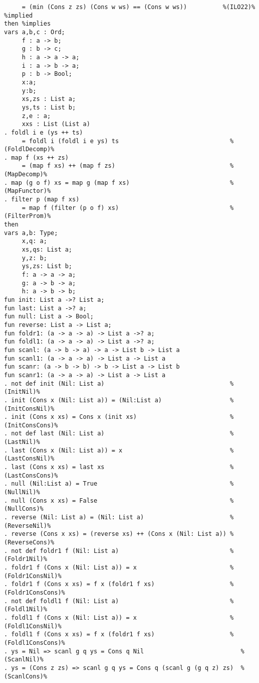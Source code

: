 \begin{Verbatim}
     = (min (Cons z zs) (Cons w ws) == (Cons w ws))          %(ILO22)% %implied
then %implies
vars a,b,c : Ord;
     f : a -> b;
     g : b -> c;
     h : a -> a -> a;
     i : a -> b -> a;
     p : b -> Bool;
     x:a;
     y:b;
     xs,zs : List a;
     ys,ts : List b;
     z,e : a;
     xxs : List (List a)
. foldl i e (ys ++ ts) 
     = foldl i (foldl i e ys) ts                               %(FoldlDecomp)%
. map f (xs ++ zs) 
     = (map f xs) ++ (map f zs)                                %(MapDecomp)%
. map (g o f) xs = map g (map f xs)                            %(MapFunctor)%
. filter p (map f xs) 
     = map f (filter (p o f) xs)                               %(FilterProm)%
then
vars a,b: Type;
     x,q: a;
     xs,qs: List a;
     y,z: b;
     ys,zs: List b;
     f: a -> a -> a;
     g: a -> b -> a;
     h: a -> b -> b;
fun init: List a ->? List a;
fun last: List a ->? a;
fun null: List a -> Bool;
fun reverse: List a -> List a;
fun foldr1: (a -> a -> a) -> List a ->? a;
fun foldl1: (a -> a -> a) -> List a ->? a;
fun scanl: (a -> b -> a) -> a -> List b -> List a
fun scanl1: (a -> a -> a) -> List a -> List a
fun scanr: (a -> b -> b) -> b -> List a -> List b
fun scanr1: (a -> a -> a) -> List a -> List a
. not def init (Nil: List a)                                   %(InitNil)%
. init (Cons x (Nil: List a)) = (Nil:List a)                   %(InitConsNil)%
. init (Cons x xs) = Cons x (init xs)                          %(InitConsCons)%
. not def last (Nil: List a)                                   %(LastNil)%
. last (Cons x (Nil: List a)) = x                              %(LastConsNil)%
. last (Cons x xs) = last xs                                   %(LastConsCons)%
. null (Nil:List a) = True                                     %(NullNil)%
. null (Cons x xs) = False                                     %(NullCons)%
. reverse (Nil: List a) = (Nil: List a)                        %(ReverseNil)%
. reverse (Cons x xs) = (reverse xs) ++ (Cons x (Nil: List a)) %(ReverseCons)%
. not def foldr1 f (Nil: List a)                               %(Foldr1Nil)%
. foldr1 f (Cons x (Nil: List a)) = x                          %(Foldr1ConsNil)%
. foldr1 f (Cons x xs) = f x (foldr1 f xs)                     %(Foldr1ConsCons)%
. not def foldl1 f (Nil: List a)                               %(Foldl1Nil)%
. foldl1 f (Cons x (Nil: List a)) = x                          %(Foldl1ConsNil)%
. foldl1 f (Cons x xs) = f x (foldr1 f xs)                     %(Foldl1ConsCons)%
. ys = Nil => scanl g q ys = Cons q Nil                           %(ScanlNil)%
. ys = (Cons z zs) => scanl g q ys = Cons q (scanl g (g q z) zs)  %(ScanlCons)%

\end{Verbatim}

